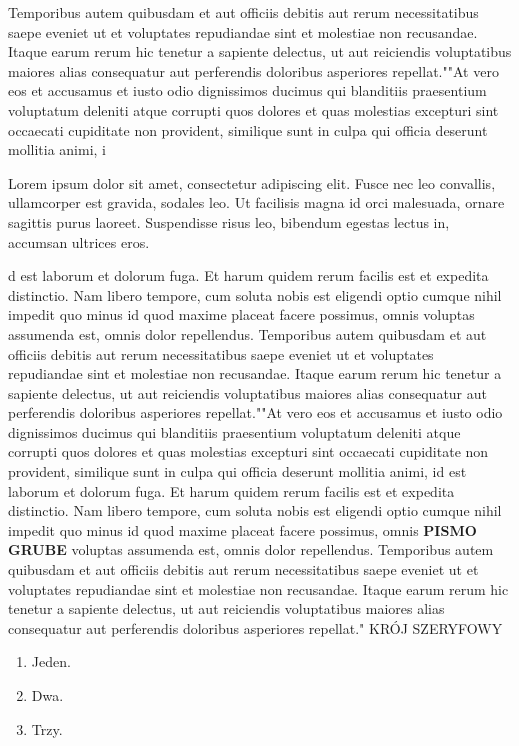 \documentclass[12pt,a4paper]{article}
\begin{document}
Temporibus autem quibusdam et aut officiis debitis aut rerum necessitatibus saepe eveniet ut et voluptates repudiandae sint et molestiae non recusandae. Itaque earum rerum hic tenetur a sapiente delectus, ut aut reiciendis voluptatibus maiores alias consequatur aut perferendis doloribus asperiores repellat.""At vero eos et accusamus et iusto odio dignissimos ducimus qui blanditiis praesentium voluptatum deleniti atque corrupti quos dolores et quas molestias excepturi sint occaecati cupiditate non provident, similique sunt in culpa qui officia deserunt mollitia animi, i

 Lorem ipsum dolor sit amet, consectetur adipiscing elit. Fusce nec leo convallis, ullamcorper est gravida, sodales leo. Ut facilisis magna id orci malesuada, ornare sagittis purus laoreet. Suspendisse risus leo, bibendum egestas lectus in, accumsan ultrices eros. 
 

d est laborum et dolorum fuga. Et harum quidem rerum facilis est et 
expedita distinctio. Nam libero tempore, cum soluta nobis est eligendi optio cumque nihil impedit quo minus id quod maxime placeat facere possimus, omnis voluptas assumenda est, omnis dolor repellendus. Temporibus autem quibusdam et aut officiis debitis aut rerum necessitatibus saepe eveniet ut et voluptates repudiandae sint et molestiae non recusandae. Itaque earum rerum hic tenetur a sapiente delectus, ut aut reiciendis voluptatibus maiores alias consequatur aut perferendis doloribus asperiores repellat.""At vero eos et accusamus et iusto odio dignissimos ducimus qui blanditiis praesentium voluptatum deleniti atque corrupti quos dolores et quas molestias excepturi sint occaecati cupiditate non provident, similique sunt in culpa qui officia deserunt mollitia animi, id est laborum et dolorum fuga. Et harum quidem rerum facilis est et expedita distinctio. Nam libero tempore, cum soluta nobis est eligendi optio cumque nihil impedit quo minus id quod maxime placeat facere possimus, omnis \textbf{PISMO GRUBE} voluptas assumenda est, omnis dolor repellendus. Temporibus autem quibusdam et aut officiis debitis aut rerum necessitatibus saepe eveniet ut et voluptates repudiandae sint et molestiae non recusandae. Itaque earum rerum hic tenetur a sapiente delectus, ut aut reiciendis voluptatibus maiores alias consequatur aut perferendis doloribus asperiores repellat." \textrm{KRÓJ SZERYFOWY}

\begin{enumerate}
    \item Jeden.
    \item Dwa.
    \item Trzy.
\end{enumerate}
\end{document}

